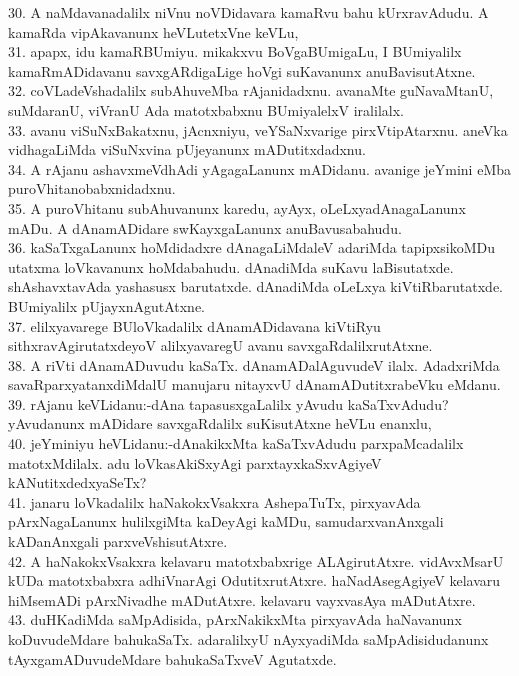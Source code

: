 \documentclass{article}
\begin{document}
30. A naMdavanadalilx niVnu noVDidavara kamaRvu bahu kUrxravAdudu. A kamaRda vipAkavanunx heVLutetxVne keVLu,\\
31. apapx, idu kamaRBUmiyu. mikakxvu BoVgaBUmigaLu, I BUmiyalilx kamaRmADidavanu savxgARdigaLige hoVgi suKavanunx anuBavisutAtxne.\\
32. coVLadeVshadalilx subAhuveMba rAjanidadxnu. avanaMte guNavaMtanU, suMdaranU, viVranU Ada matotxbabxnu BUmiyalelxV iralilalx.\\
33. avanu viSuNxBakatxnu, jAcnxniyu, veYSaNxvarige pirxVtipAtarxnu. aneVka vidhagaLiMda viSuNxvina pUjeyanunx mADutitxdadxnu.\\
34. A rAjanu ashavxmeVdhAdi yAgagaLanunx mADidanu. avanige jeYmini eMba puroVhitanobabxnidadxnu.\\
35. A puroVhitanu subAhuvanunx karedu, ayAyx, oLeLxyadAnagaLanunx mADu. A dAnamADidare swKayxgaLanunx anuBavusabahudu.\\
36. kaSaTxgaLanunx hoMdidadxre dAnagaLiMdaleV adariMda tapipxsikoMDu utatxma loVkavanunx hoMdabahudu. dAnadiMda suKavu laBisutatxde. shAshavxtavAda yashasusx barutatxde. dAnadiMda oLeLxya kiVtiRbarutatxde. BUmiyalilx pUjayxnAgutAtxne.\\
37. elilxyavarege BUloVkadalilx dAnamADidavana kiVtiRyu sithxravAgirutatxdeyoV alilxyavaregU avanu savxgaRdalilxrutAtxne.\\
38. A riVti dAnamADuvudu kaSaTx. dAnamADalAguvudeV ilalx. AdadxriMda savaRparxyatanxdiMdalU manujaru nitayxvU dAnamADutitxrabeVku eMdanu.\\
39. rAjanu keVLidanu:-dAna tapasusxgaLalilx yAvudu kaSaTxvAdudu? yAvudanunx mADidare savxgaRdalilx suKisutAtxne heVLu enanxlu,\\
40. jeYminiyu heVLidanu:-dAnakikxMta kaSaTxvAdudu parxpaMcadalilx matotxMdilalx. adu loVkasAkiSxyAgi parxtayxkaSxvAgiyeV kANutitxdedxyaSeTx?\\
41. janaru loVkadalilx haNakokxVsakxra AshepaTuTx, pirxyavAda pArxNagaLanunx hulilxgiMta kaDeyAgi kaMDu, samudarxvanAnxgali kADanAnxgali parxveVshisutAtxre.\\
42. A haNakokxVsakxra kelavaru matotxbabxrige ALAgirutAtxre. vidAvxMsarU kUDa matotxbabxra adhiVnarAgi OdutitxrutAtxre. haNadAsegAgiyeV kelavaru hiMsemADi pArxNivadhe mADutAtxre. kelavaru vayxvasAya mADutAtxre.\\
43. duHKadiMda saMpAdisida, pArxNakikxMta pirxyavAda haNavanunx koDuvudeMdare bahukaSaTx. adaralilxyU nAyxyadiMda saMpAdisidudanunx tAyxgamADuvudeMdare bahukaSaTxveV Agutatxde.\\
\end{document}
